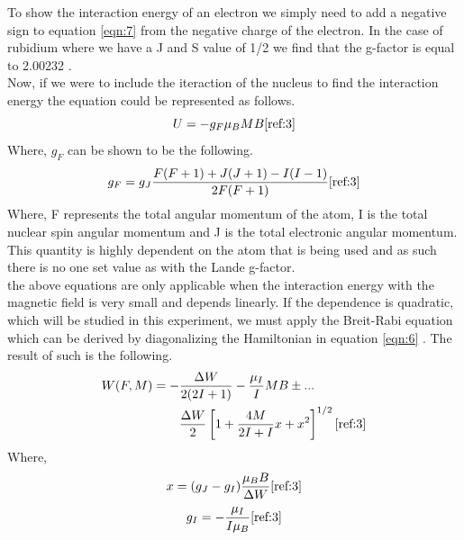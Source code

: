 \documentclass[twocolumn]{article}
\begin{document}
To show the interaction energy of an electron we simply need to add a negative 
sign to equation \ref{eqn:7} from the negative charge of the electron. In the 
case of rubidium where we have a J and S value of 1/2 we find that the g-factor 
is equal to 2.00232 \cite{ref:3}.
\\
Now, if we were to include the iteraction of the nucleus to find the 
interaction energy the equation could be represented as follows.
\begin{equation}
U = -g_F\mu_B M B
\label{eqn:9}
\cite{ref:3}
\end{equation}
Where, $g_F$ can be shown to be the following.
\begin{equation}
g_F = g_J\frac{F(F+1)+J(J+1)-I(I-1)}{2F(F+1)}
\label{eqn:10}
\cite{ref:3}
\end{equation}
Where, F represents the total angular momentum of the atom, I is the total 
nuclear spin angular momentum and J is the total electronic angular momentum. 
This quantity is highly dependent on the atom that is being used and as such 
there is no one set value as with the Lande g-factor.
\\
the above equations are only applicable when the interaction energy with the 
magnetic field is very small and depends linearly. If the dependence is 
quadratic, which will be studied in this experiment, we must apply the 
Breit-Rabi equation which can be derived by diagonalizing the Hamiltonian in 
equation \ref{eqn:6} \cite{ref:3}. The result of such is the following.
\begin{equation}
\begin{aligned}
W(F,M) = -&\frac{\Delta W}{2(2I+1)}-\frac{\mu_I}{I}MB\pm ...
\\
          &\frac{\Delta W}{2}\left[1+\frac{4M}{2I+I}x+x^2\right]^{1/2}
\label{eqn:11}
\cite{ref:3}
\end{aligned}
\end{equation}
Where,
\begin{equation}
x = (g_J - g_I)\frac{\mu_B B}{\Delta W}
\label{eqn:12}
\cite{ref:3}
\end{equation}
\begin{equation}
g_I = -\frac{\mu_I}{I\mu_B}
\label{eqn:13}
\cite{ref:3}
\end{equation}
\end{document}

